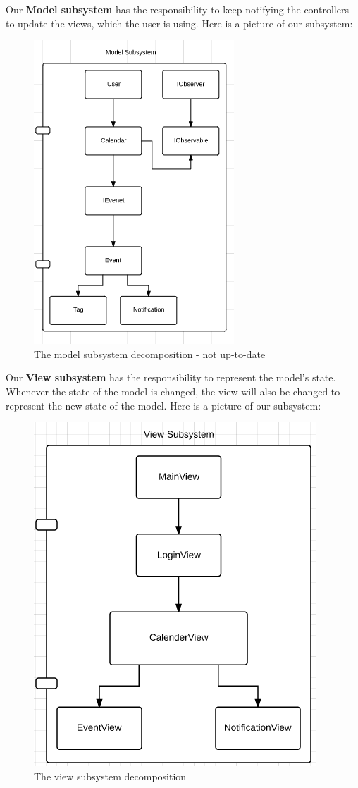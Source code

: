 Our \textbf{Model subsystem} has the responsibility to keep notifying the controllers to update the views, which the user is using. Here is a picture of our subsystem:\\
\begin{figure}[h!]
	\centering
		\includegraphics[scale=0.8]{modelSubsystem}
		\caption{The model subsystem decomposition - not up-to-date}
  \label{fig:ModelSubsystemDecomposition}
\end{figure}
\pagebreak

Our \textbf{View subsystem} has the responsibility to represent the model’s state. Whenever the state of the model is changed, the view will also be changed to represent the new state of the model. Here is a picture of our subsystem:\\
\begin{figure}[h!]
	\centering
		\includegraphics[scale=0.8]{viewSubsystem}
	\caption{The view subsystem decomposition}
  \label{fig:ViewSubsystemDecomposition}
\end{figure}
\\

